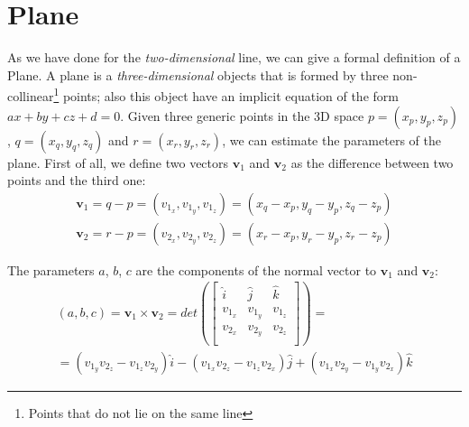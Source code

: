 \section{Plane}
\label{sec:plane}
As we have done for the \textit{two-dimensional} line, we can give a formal definition of a Plane. A plane is a \textit{three-dimensional} objects that is formed by three non-collinear\footnote{Points that do not lie on the same line} points; also this object have an implicit equation of the form $ax + by + cz + d = 0$. \newline
Given three generic points in the 3D space $p = (x_p, y_p, z_p)$, $q = (x_q, y_q, z_q)$ and $r = (x_r, y_r, z_r)$, we can estimate the parameters of the plane. \newline
First of all, we define two vectors $\textbf{v}_1$ and $\textbf{v}_2$ as the difference between two points and the third one:
\begin{equation}
    \begin{gathered}
        \textbf{v}_1 = q - p = (v_{1_x}, v_{1_y}, v_{1_z}) = (x_q - x_p, y_q - y_p, z_q - z_p) \\
        \textbf{v}_2 = r - p = (v_{2_x}, v_{2_y}, v_{2_z}) = (x_r - x_p, y_r - y_p, z_r - z_p)
    \end{gathered}
\end{equation}

The parameters $a$, $b$, $c$ are the components of the normal vector to $\textbf{v}_1$ and $\textbf{v}_2$:
\begin{equation}
    \begin{gathered}
        (a, b, c) = \textbf{v}_1 \times \textbf{v}_2 = det \left ( 
                                    \begin{bmatrix}
                                        \hat{i} & \hat{j} & \hat{k} \\
                                        v_{1_x} & v_{1_y} & v_{1_z} \\
                                        v_{2_x} & v_{2_y} & v_{2_z} \\
                                    \end{bmatrix}
                                    \right ) = \\
             = (v_{1_y}v_{2_z} - v_{1_z}v_{2_y})\hat{i} - (v_{1_x}v_{2_z} - v_{1_z}v_{2_x})\hat{j} + (v_{1_x}v_{2_y} - v_{1_y}v_{2_x})\hat{k}
    \end{gathered}
\end{equation}

